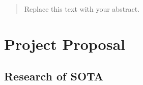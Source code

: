 


\newcommand{\TUGn}{Graz University of Technology}

\address[ICG]{Inst. for Computer Graphics and Vision \\ \TUGn, Austria}



















\begin{abstract}



Replace this text with your abstract.





\end{abstract}






\section{Project Proposal}

\subsection{Research of SOTA} %
\label{sub:research_of_sota}

